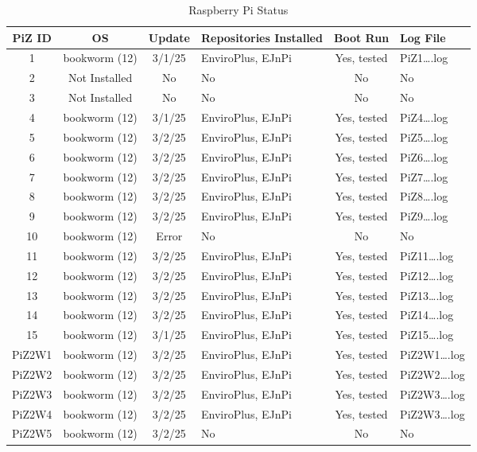 \documentclass{article}
\begin{document}
\begin{table}[h!]
\begin{center}
\begin{tabular}{|c|c|c|p{2.3cm}|c| l|}
\hline
\textbf{PiZ ID} & \textbf{OS} & \textbf{Update} & \textbf{Repositories Installed} & \textbf{Boot Run} & \textbf{Log File} \\
\hline
1  & bookworm (12)    & 3/1/25 & EnviroPlus, EJnPi & Yes, tested  & PiZ1\ldots.log\\
2  & Not Installed    & No & No  & No & No\\
3  & Not Installed    & No & No & No & No\\
4  & bookworm (12)    & 3/1/25 & EnviroPlus, EJnPi & Yes, tested & PiZ4\ldots.log \\

5  & bookworm (12)    & 3/2/25 & EnviroPlus, EJnPi & Yes, tested & PiZ5\ldots.log \\
6  & bookworm (12)    & 3/2/25 & EnviroPlus, EJnPi & Yes, tested & PiZ6\ldots.log \\
7  & bookworm (12)    & 3/2/25 & EnviroPlus, EJnPi & Yes, tested & PiZ7\ldots.log \\
8  & bookworm (12)    & 3/2/25 & EnviroPlus, EJnPi & Yes, tested & PiZ8\ldots.log \\

9  & bookworm (12)    & 3/2/25 & EnviroPlus, EJnPi & Yes, tested& PiZ9\ldots.log\\
10 & bookworm (12)    & Error & No & No & No \\
11 & bookworm (12)    & 3/2/25 & EnviroPlus, EJnPi & Yes, tested & PiZ11\ldots.log \\
12 & bookworm (12)    & 3/2/25 & EnviroPlus, EJnPi & Yes, tested & PiZ12\ldots.log \\

13 & bookworm (12)    & 3/2/25 & EnviroPlus, EJnPi & Yes, tested & PiZ13\ldots.log \\
14 & bookworm (12)    & 3/2/25 & EnviroPlus, EJnPi & Yes, tested & PiZ14\ldots.log  \\
15 & bookworm (12)    & 3/1/25 & EnviroPlus, EJnPi & Yes, tested & PiZ15\ldots.log \\
PiZ2W1 & bookworm (12)& 3/2/25  & EnviroPlus, EJnPi & Yes, tested & PiZ2W1\ldots.log \\
PiZ2W2 & bookworm (12)& 3/2/25  & EnviroPlus, EJnPi & Yes, tested & PiZ2W2\ldots.log \\
PiZ2W3 & bookworm (12)& 3/2/25  & EnviroPlus, EJnPi & Yes, tested & PiZ2W3\ldots.log \\
PiZ2W4 & bookworm (12)& 3/2/25  & EnviroPlus, EJnPi & Yes, tested & PiZ2W3\ldots.log \\
PiZ2W5 & bookworm (12)& 3/2/25  & No & No & No \\
\hline
\end{tabular}
\end{center}
\caption{Raspberry Pi Status}
\label{table:1}
\end{table}
\end{document}
